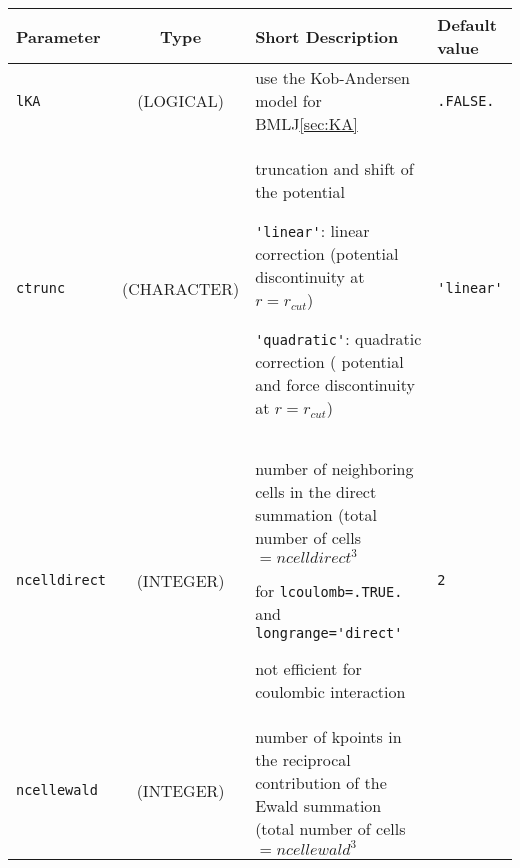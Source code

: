 \documentclass[a4paper]{article}
\begin{document}
\begin{longtable}{l|c|m{8cm}|m{2cm}}
\hline
\hline
Parameter          &  Type              &          Short Description                                                          & Default value \\
\hline
\hline
\rule[-0.75cm]{0cm}{1.5cm}
\verb?lKA?         &  (LOGICAL)         & use the Kob-Andersen model for BMLJ\ref{sec:KA}                                     & \verb?.FALSE.? \\
\hline
\rule[-0.75cm]{0cm}{1.5cm}
\verb?ctrunc?      &  (CHARACTER)       & \newline truncation and shift of the potential \newline 

                                         \verb?'linear'?: linear correction (potential discontinuity at $r=r_{cut}$) \newline 
					 
                   			 \verb?'quadratic'?: quadratic correction ( potential and force 
					 discontinuity at $r=r_{cut}$) \newline                                               & \verb?'linear'? \tabularnewline
\hline
\rule[-0.75cm]{0cm}{1.5cm}
\verb?ncelldirect? &  (INTEGER)         & \newline number of neighboring cells in the direct summation 
                                         (total number of cells $=ncelldirect^3$ \newline 

                                          for \verb?lcoulomb=.TRUE.? and \verb?longrange='direct'?  \newline                  
					  
					  not efficient for coulombic interaction                                             & \verb?2? \\
\hline
\rule[-0.75cm]{0cm}{1.5cm}
\verb?ncellewald?  &  (INTEGER)         & \newline number of kpoints in the reciprocal contribution of the Ewald summation
                                         (total number of cells $=ncellewald^3$ \newline                                      
					 

\end{longtable}
\end{document}
